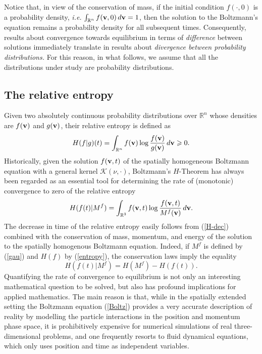 \documentclass{article}
\newcommand{\bv}{\mathrm{BV}}
\renewcommand{\ge}{\geqslant}
\newcommand{\fer}[1]{(\ref{#1})}
\newcommand{\R}{\mathbb R}
\def\R{\mathbb{R}}
\def\bv{{\bf v}}
\def \erre{\mathbb{R}}
\begin{document}
% 
Notice that, in view of the conservation of mass, if the initial condition $f(\cdot,0)$ is a probability density, \textit{i.e.}  $\int_{\erre^n} f(\bv,0)\,d\bv =1$, then the solution to the Boltzmann's equation remains a probability density for all subsequent times. 
% 
Consequently, results about convergence towards equilibrium in terms of \emph{difference} between solutions immediately translate in results about \emph{divergence between probability distributions.} 
% 
For this reason, in what follows, we assume that all the distributions under study are probability distributions.

 

\subsection{The relative entropy} 

% 
Given two absolutely continuous probability distributions over $\erre^n$ whose densities are $f(\bv)$ and $g(\bv)$, their relative entropy is defined as
\begin{equation}
    \label{rel-ent}
    H(f|g)(t) =  \int_{\R^n} f(\bv) \log \frac{f(\bv)}{g(\bv)}\, d\bv \ge 0.
\end{equation}
% 
Historically, given the solution $f(\bv,t)$ of the spatially homogeneous Boltzmann equation with a general kernel $\mathcal{K}(\nu, \cdot)$, Boltzmann's $H$-Theorem has always been regarded as an essential tool for determining the rate of (monotonic) convergence to zero of the relative entropy
\[
    H(f(t)|M^f)=  \int_{\R^3} f(\bv,t) \log \frac{f(\bv,t)}{M^f(\bv)}\, d\bv.
\]
The decrease in time of the relative entropy easily follows from \fer{H-dec} combined with the conservation of mass, momentum, and energy of the solution to the spatially homogenous Boltzmann equation. 
% 
Indeed, if  $M^f$ is defined by \fer{gau} and $H(f)$ by \fer{entropy}, the conservation laws imply the equality
\[
    H(f(t)|M^f) =H(M^f)- H(f(t)).
\]
Quantifying the rate of convergence to equilibrium is not only an interesting mathematical question to be solved, but also has profound implications for applied mathematics. 
% 
The main reason is that, while in the spatially {extended} setting the Boltzmann equation \fer{Boltz} provides a very accurate description of reality by modelling the particle  interactions in the position and momentum phase space, it is prohibitively expensive for numerical simulations of real three-dimensional problems, and one frequently resorts to fluid dynamical equations, which only uses position and time as independent variables. 
% 
\end{document}
